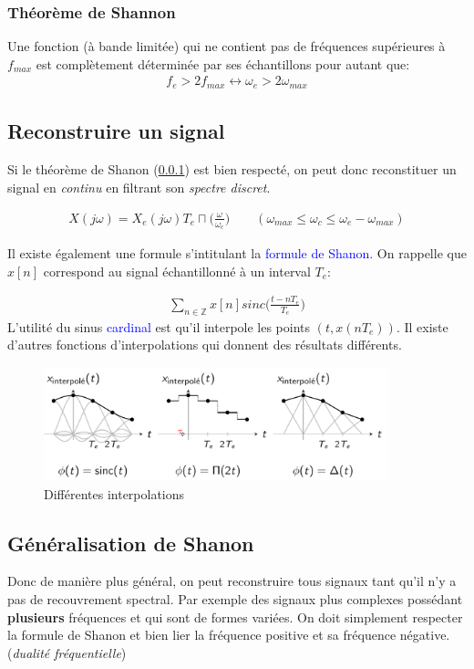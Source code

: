 \documentclass{report}
\begin{document}
\subsubsection{Théorème de Shannon} \label{Sha}
Une fonction (à bande limitée) qui ne contient pas de fréquences supérieures à $f_{max}$ est complètement déterminée par ses échantillons pour autant que:
\begin{align*}
f_e > 2 f_{max} \longleftrightarrow \omega_e > 2 \omega_{max}
\end{align*}	

\subsection{Reconstruire un signal}
Si le théorème de Shanon (\ref{Sha}) est bien respecté, on peut donc reconstituer un signal en \textit{continu} en filtrant son \textit{spectre discret}.

\begin{align*}
X(j\omega) = X_e(j\omega) T_e \sqcap \Bigr( \frac{\omega}{\omega_c} \Bigr) \qquad (\omega_{max} \leq \omega_c \leq \omega_e - \omega_{max})
\end{align*}

Il existe également une formule s'intitulant la \textcolor{blue}{formule de Shanon}. On rappelle que $x[n]$ correspond au signal échantillonné à un interval $T_e$:

\begin{align*}
\sum_{n \in \mathbb{Z}} x[n] sinc\Bigr( \frac{t-nT_e}{T_e} \Bigr)
\end{align*}
L'utilité du sinus \textcolor{blue}{cardinal} est qu'il interpole les points $(t, x(nT_e))$. Il existe d'autres fonctions d'interpolations qui donnent des résultats différents.
\begin{figure}[H]
\centering
\includegraphics[width=10cm]{img/int.png}
\caption{Différentes interpolations}
\end{figure}

\subsection{Généralisation de Shanon}
Donc de manière plus général, on peut reconstruire tous signaux tant qu'il n'y a pas de recouvrement spectral. Par exemple des signaux plus complexes possédant \textbf{plusieurs} fréquences et qui sont de formes variées. On doit simplement respecter la formule de Shanon et bien lier la fréquence positive et sa fréquence négative. (\textit{dualité fréquentielle})
\end{document}
